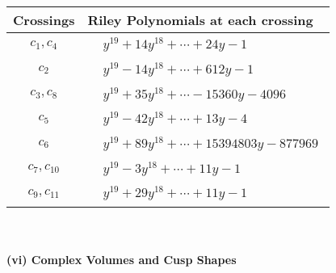 \documentclass[1p]{elsarticle_modified}
\theoremstyle{definition}
\begin{document}
\begin{tabular}{m{50pt}|m{274pt}}
Crossings & \hspace{64pt}Riley Polynomials at each crossing \\
\hline $$\begin{aligned}c_{1},c_{4}\end{aligned}$$&$\begin{aligned}
&y^{19}+14 y^{18}+\cdots+24 y-1
\end{aligned}$\\
\hline $$\begin{aligned}c_{2}\end{aligned}$$&$\begin{aligned}
&y^{19}-14 y^{18}+\cdots+612 y-1
\end{aligned}$\\
\hline $$\begin{aligned}c_{3},c_{8}\end{aligned}$$&$\begin{aligned}
&y^{19}+35 y^{18}+\cdots-15360 y-4096
\end{aligned}$\\
\hline $$\begin{aligned}c_{5}\end{aligned}$$&$\begin{aligned}
&y^{19}-42 y^{18}+\cdots+13 y-4
\end{aligned}$\\
\hline $$\begin{aligned}c_{6}\end{aligned}$$&$\begin{aligned}
&y^{19}+89 y^{18}+\cdots+15394803 y-877969
\end{aligned}$\\
\hline $$\begin{aligned}c_{7},c_{10}\end{aligned}$$&$\begin{aligned}
&y^{19}-3 y^{18}+\cdots+11 y-1
\end{aligned}$\\
\hline $$\begin{aligned}c_{9},c_{11}\end{aligned}$$&$\begin{aligned}
&y^{19}+29 y^{18}+\cdots+11 y-1
\end{aligned}$\\
\hline
\end{tabular}\\~\\
\newpage\flushleft \textbf{(vi) Complex Volumes and Cusp Shapes}
\end{document}
